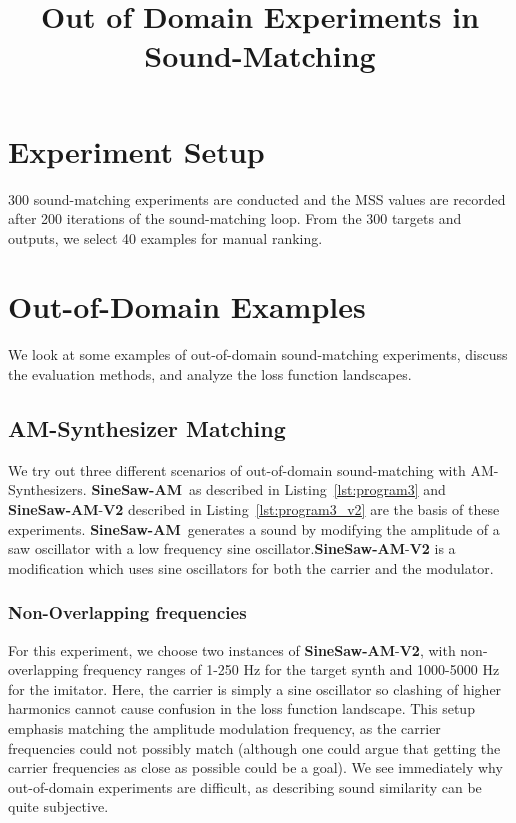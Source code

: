 \documentclass[12pt, oneside]{article} %
\title{Out of Domain Experiments in Sound-Matching}
\newcommand{\FMMod}{\textbf{SineSaw-AM}}
\begin{document}
\maketitle


\section{Experiment Setup}
\label{sec:experiment_setup}
300 sound-matching experiments are conducted and the MSS values are recorded after 200 iterations of the sound-matching loop. From the 300 targets and outputs, we select 40 examples for manual ranking. 


\section{Out-of-Domain Examples}
We look at some examples of out-of-domain sound-matching experiments, discuss the evaluation methods, and analyze the loss function landscapes. 


\subsection{AM-Synthesizer Matching}
We try out three different scenarios of out-of-domain sound-matching with AM-Synthesizers. \FMMod~as described in Listing~\ref{lst:program3} and \FMMod-\textbf{V2} described in Listing~\ref{lst:program3_v2} are the basis of these experiments. \FMMod~generates a sound by modifying the amplitude of a saw oscillator with a low frequency sine oscillator.\FMMod-\textbf{V2} is a modification which uses sine oscillators for both the carrier and the modulator. 

\subsubsection{Non-Overlapping frequencies}
For this experiment, we choose two instances of \FMMod-\textbf{V2}, with non-overlapping frequency ranges of 1-250 Hz for the target synth and 1000-5000 Hz for the imitator. Here, the carrier is simply a sine oscillator so clashing of higher harmonics cannot cause confusion in the loss function landscape. This setup emphasis matching the amplitude modulation frequency, as the carrier frequencies could not possibly match (although one could argue that getting the carrier frequencies as close as possible could be a goal). We see immediately why out-of-domain experiments are difficult, as describing sound similarity can be quite subjective. 
\end{document}
